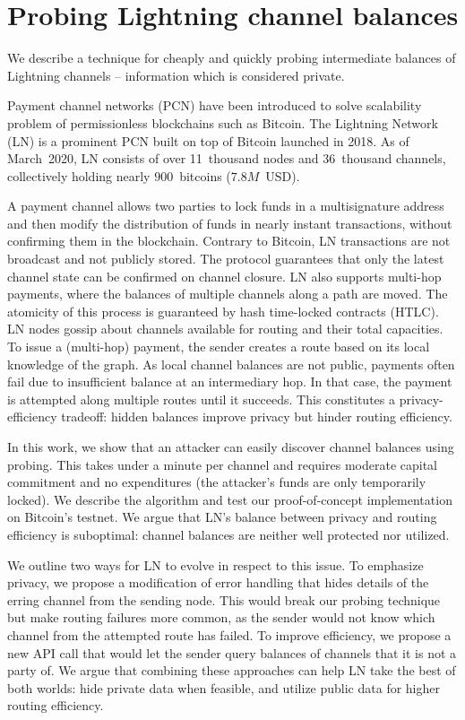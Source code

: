 \chapter{Probing Lightning channel balances}

\label{Chapter06LNprobing}

We describe a technique for cheaply and quickly probing intermediate balances of Lightning channels -- information which is considered private.


Payment channel networks (PCN) have been introduced to solve scalability problem of permissionless blockchains such as Bitcoin.
The Lightning Network (LN) is a prominent PCN built on top of Bitcoin launched in 2018.
As of March~2020, LN consists of over 11~thousand nodes and 36~thousand channels, collectively holding nearly $900$~bitcoins ($7.8M$~USD).

A payment channel allows two parties to lock funds in a multisignature address and then modify the distribution of funds in nearly instant transactions, without confirming them in the blockchain.
Contrary to Bitcoin, LN transactions are not broadcast and not publicly stored.
The protocol guarantees that only the latest channel state can be confirmed on channel closure.
LN also supports multi-hop payments, where the balances of multiple channels along a path are moved.
The atomicity of this process is guaranteed by hash time-locked contracts (HTLC).
LN nodes gossip about channels available for routing and their total capacities.
To issue a (multi-hop) payment, the sender creates a route based on its local knowledge of the graph.
As local channel balances are not public, payments often fail due to insufficient balance at an intermediary hop.
In that case, the payment is attempted along multiple routes until it succeeds.
This constitutes a privacy-efficiency tradeoff: hidden balances improve privacy but hinder routing efficiency.

In this work, we show that an attacker can easily discover channel balances using probing.
This takes under a minute per channel and requires moderate capital commitment and no expenditures (the attacker's funds are only temporarily locked).
We describe the algorithm and test our proof-of-concept implementation on Bitcoin's testnet.
We argue that LN's balance between privacy and routing efficiency is suboptimal: channel balances are neither well protected nor utilized.

We outline two ways for LN to evolve in respect to this issue.
To emphasize privacy, we propose a modification of error handling that hides details of the erring channel from the sending node.
This would break our probing technique but make routing failures more common, as the sender would not know which channel from the attempted route has failed.
To improve efficiency, we propose a new API call that would let the sender query balances of channels that it is not a party of.
We argue that combining these approaches can help LN take the best of both worlds: hide private data when feasible, and utilize public data for higher routing efficiency.



